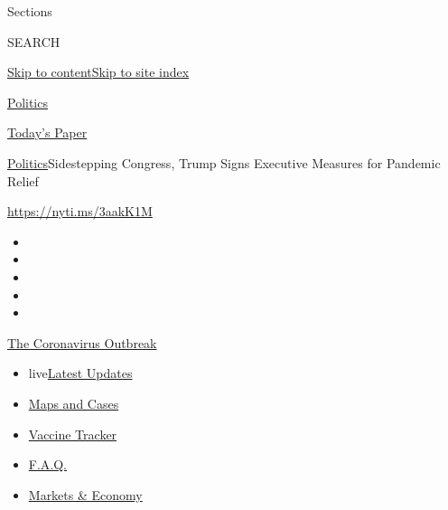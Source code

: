 Sections

SEARCH

\protect\hyperlink{site-content}{Skip to
content}\protect\hyperlink{site-index}{Skip to site index}

\href{https://www.nytimes.com/section/politics}{Politics}

\href{https://myaccount.nytimes.com/auth/login?response_type=cookie\&client_id=vi}{}

\href{https://www.nytimes.com/section/todayspaper}{Today's Paper}

\href{/section/politics}{Politics}\textbar{}Sidestepping Congress, Trump
Signs Executive Measures for Pandemic Relief

\href{https://nyti.ms/3aakK1M}{https://nyti.ms/3aakK1M}

\begin{itemize}
\item
\item
\item
\item
\item
\end{itemize}

\href{https://www.nytimes.com/news-event/coronavirus?action=click\&pgtype=Article\&state=default\&region=TOP_BANNER\&context=storylines_menu}{The
Coronavirus Outbreak}

\begin{itemize}
\tightlist
\item
  live\href{https://www.nytimes.com/2020/08/08/world/coronavirus-updates.html?action=click\&pgtype=Article\&state=default\&region=TOP_BANNER\&context=storylines_menu}{Latest
  Updates}
\item
  \href{https://www.nytimes.com/interactive/2020/us/coronavirus-us-cases.html?action=click\&pgtype=Article\&state=default\&region=TOP_BANNER\&context=storylines_menu}{Maps
  and Cases}
\item
  \href{https://www.nytimes.com/interactive/2020/science/coronavirus-vaccine-tracker.html?action=click\&pgtype=Article\&state=default\&region=TOP_BANNER\&context=storylines_menu}{Vaccine
  Tracker}
\item
  \href{https://www.nytimes.com/interactive/2020/world/coronavirus-tips-advice.html?action=click\&pgtype=Article\&state=default\&region=TOP_BANNER\&context=storylines_menu}{F.A.Q.}
\item
  \href{https://www.nytimes.com/live/2020/08/07/business/stock-market-today-coronavirus?action=click\&pgtype=Article\&state=default\&region=TOP_BANNER\&context=storylines_menu}{Markets
  \& Economy}
\end{itemize}

